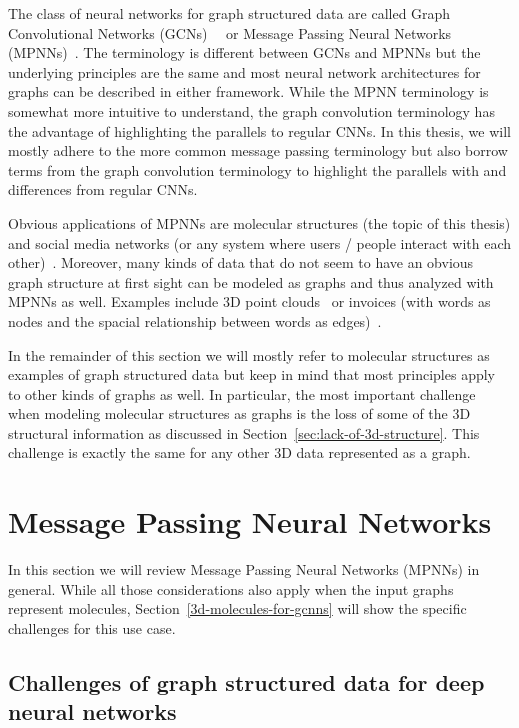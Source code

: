 The class of neural networks for graph structured data are called Graph Convolutional Networks (GCNs)~\cite{Kipf2017}~\cite{Schutt2017} or Message Passing Neural Networks (MPNNs)~\cite{Gilmer2017}. The terminology is different between GCNs and MPNNs but the underlying principles are the same and most neural network architectures for graphs can be described in either framework. While the MPNN terminology is somewhat more intuitive to understand, the graph convolution terminology has the advantage of highlighting the parallels to regular CNNs. In this thesis, we will mostly adhere to the more common message passing terminology but also borrow terms from the graph convolution terminology to highlight the parallels with and differences from regular CNNs.

Obvious applications of MPNNs are molecular structures (the topic of this thesis) and social media networks (or any system where users / people interact with each other)~\cite{Zhou2018}. Moreover, many kinds of data that do not seem to have an obvious graph structure at first sight can be modeled as graphs and thus analyzed with MPNNs as well. Examples include 3D point clouds~\cite{Charles2017} or invoices (with words as nodes and the spacial relationship between words as edges)~\cite{Riba2019}.

In the remainder of this section we will mostly refer to molecular structures as examples of graph structured data but keep in mind that most principles apply to other kinds of graphs as well. In particular, the most important challenge when modeling molecular structures as graphs is the loss of some of the 3D structural information as discussed in Section~\ref{sec:lack-of-3d-structure}. This challenge is exactly the same for any other 3D data represented as a graph.

\section{Message Passing Neural Networks}

In this section we will review Message Passing Neural Networks (MPNNs) in general. While all those considerations also apply when the input graphs represent molecules, Section~\ref{3d-molecules-for-gcnns} will show the specific challenges for this use case.

\subsection{Challenges of graph structured data for deep neural networks}
\label{sec:graph-challenges}

